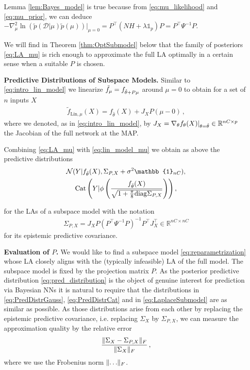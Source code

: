 Lemma \ref{lem:Bayes_model} is true because from \eqref{eq:mu_likelihood} and \eqref{eq:mu_prior}, we can deduce $-\nabla_\mu^2 \ln\left(\tilde{p}(\mathcal{D}|\mu) \tilde{p}(\mu)\right) \vert_{\mu=0} = P^\intercal (NH+ \lambda \mathbb{1}_p)P = P^\intercal \Psi^{-1} P$.

We will find in Theorem \ref{thm:OptSubmodel} below that the family of posteriors \eqref{eq:LA_mu} is rich enough to approximate the full LA optimally in a certain sense when a suitable $P$ is chosen.

\textbf{Predictive Distributions of Subspace Models.}
Similar to \eqref{eq:intro_lin_model} we linearize $\tilde{f}_{\mu} =f_{\hat{\theta} + P \mu}$ around $\mu=0$ to obtain for a set of $n$ inputs $X$ 
\begin{align}
    \label{eq:lin_model_mu}
    \tilde{f}_{\mathrm{Lin},\mu}(X) = f_{\hat{\theta}}(X) + J_X P (\mu-0) \,,
\end{align}
where we denoted, as in \eqref{eq:intro_lin_model}, by $J_X=\nabla_\theta f_{\theta}(X)\vert_{\theta=\hat{\theta}} \in \mathbb{R}^{nC\times p}$ the Jacobian of the full network at the MAP.

Combining \eqref{eq:LA_mu} with \eqref{eq:lin_model_mu} we obtain as above the predictive distributions
\begin{equation}
    \begin{gathered}
        \mathcal{N}(Y |f_{\map{\theta}}(X), \Sigma_{P,X}+ \sigma^2 \mathbb{1}_{nC} ), 
        \\
        \Cat\left(Y | \phi\left(\frac{f_{ \map{\theta}}(X)}{\sqrt{1 + \frac{\pi}{8} \diag\Sigma_{P,X}}}\right)\right),
    \end{gathered}
    \label{eq:LaplaceSubmodel}
\end{equation}

for the LAs of a subspace model
with the notation 
\begin{align}
    \label{eq:Sigma_p}
    \Sigma_{P,X} = J_X P (P^\intercal \Psi^{-1} P)^{-1} P^\intercal J_X^\intercal \in \mathbb{R}^{nC\times nC}
\end{align}
for its epistemic predictive covariance.

\textbf{Evaluation of $P$.} We would like to find a subspace model \eqref{eq:reparametrization} whose LA closely aligns  with the (typically infeasible) LA of the full model. The subspace model is fixed by the projection matrix $P$. 
As the posterior predictive distribution \eqref{eq:pred_distribution} is the object of genuine interest for prediction via Bayesian NNs it is natural to require that the distributions in \eqref{eq:PredDistrGauss}, \eqref{eq:PredDistrCat} and in \eqref{eq:LaplaceSubmodel} are as similar as possible.
As those distributions arise from each other by replacing the epistemic predictive covariance, i.e. replacing $\Sigma_X$ by $\Sigma_{P,X}$, we can measure the approximation quality by the relative error 
\begin{equation}
    \label{eq:RelativeError}
    \frac{\lVert \Sigma_X - \Sigma_{P,X} \rVert_F}{\lVert \Sigma_X \rVert_F}\,,
\end{equation}
where we use the Frobenius norm $\lVert \ldots \rVert_F$.

